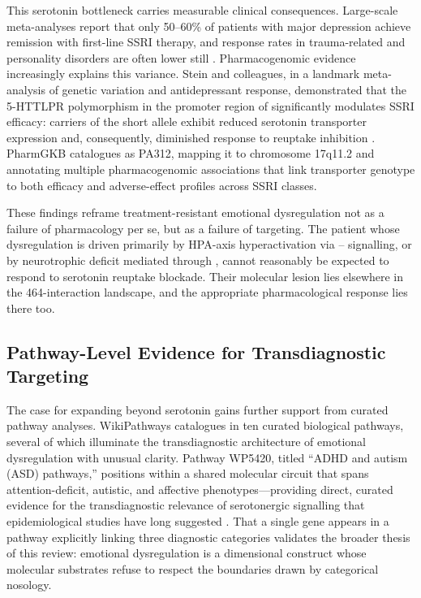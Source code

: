 This serotonin bottleneck carries measurable clinical consequences. Large-scale
meta-analyses report that only 50--60\% of patients with major depression
achieve remission with first-line SSRI therapy, and response rates in
trauma-related and personality disorders are often lower still
\cite{cipriani2018}. Pharmacogenomic evidence increasingly explains this
variance. Stein and colleagues, in a landmark meta-analysis of 
genetic variation and antidepressant response, demonstrated that the
5-HTTLPR polymorphism in the promoter region of  significantly
modulates SSRI efficacy: carriers of the short allele exhibit reduced
serotonin transporter expression and, consequently, diminished response to
reuptake inhibition \cite{stein2021}. PharmGKB catalogues  as
PA312, mapping it to chromosome 17q11.2 and annotating multiple
pharmacogenomic associations that link transporter genotype to both efficacy
and adverse-effect profiles across SSRI classes.

These findings reframe treatment-resistant emotional dysregulation not as a
failure of pharmacology per se, but as a failure of targeting. The patient whose
dysregulation is driven primarily by HPA-axis hyperactivation via
-- signalling, or by neurotrophic deficit mediated
through , cannot reasonably be expected to respond to serotonin
reuptake blockade. Their molecular lesion lies elsewhere in the 464-interaction
landscape, and the appropriate pharmacological response lies there too.

\subsection*{Pathway-Level Evidence for Transdiagnostic Targeting}

The case for expanding beyond serotonin gains further support from curated
pathway analyses. WikiPathways catalogues  in ten curated
biological pathways, several of which illuminate the transdiagnostic
architecture of emotional dysregulation with unusual clarity. Pathway WP5420,
titled ``ADHD and autism (ASD) pathways,'' positions  within a
shared molecular circuit that spans attention-deficit, autistic, and affective
phenotypes---providing direct, curated evidence for the transdiagnostic
relevance of serotonergic signalling that epidemiological studies have long
suggested \cite{faraone2015}. That a single gene appears in a pathway
explicitly linking three diagnostic categories validates the broader thesis of
this review: emotional dysregulation is a dimensional construct whose molecular
substrates refuse to respect the boundaries drawn by categorical nosology.

